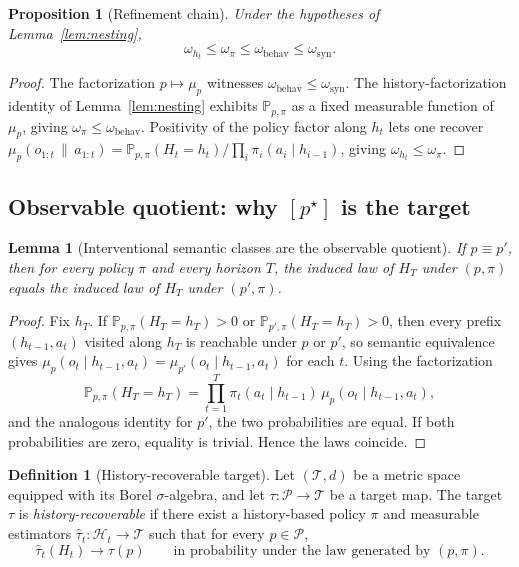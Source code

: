 \documentclass[11pt]{article}
\newtheorem{proposition}[theorem]{Proposition}
\newtheorem{lemma}[theorem]{Lemma}
\theoremstyle{definition}
\newtheorem{definition}[theorem]{Definition}
\theoremstyle{remark}
\newcommand{\Pcal}{\mathcal{P}}
\newcommand{\Hcal}{\mathcal{H}}
\newcommand{\Prob}{\mathbb{P}}
\newcommand{\givena}{\,\|\,}
\begin{document}
\begin{proposition}[Refinement chain]
\label{prop:refinement-chain}
Under the hypotheses of Lemma~\ref{lem:nesting},
\[
\omega_{h_t}\le\omega_\pi\le\omega_{\mathrm{behav}}\le\omega_{\mathrm{syn}}.
\]
\end{proposition}

\begin{proof}
The factorization $p\mapsto\mu_p$ witnesses $\omega_{\mathrm{behav}}\le\omega_{\mathrm{syn}}$. The history-factorization identity of Lemma~\ref{lem:nesting} exhibits $\Prob_{p,\pi}$ as a fixed measurable function of $\mu_p$, giving $\omega_\pi\le\omega_{\mathrm{behav}}$. Positivity of the policy factor along $h_t$ lets one recover $\mu_p(o_{1:t}\givena a_{1:t})=\Prob_{p,\pi}(H_t=h_t)/\prod_i\pi_i(a_i\mid h_{i-1})$, giving $\omega_{h_t}\le\omega_\pi$.
\end{proof}

\subsection{Observable quotient: why $[p^\star]$ is the target}

\begin{lemma}[Interventional semantic classes are the observable quotient]
\label{lem:observable-quotient}
If $p\equiv p'$, then for every policy $\pi$ and every horizon $T$, the induced law of $H_T$ under $(p,\pi)$ equals the induced law of $H_T$ under $(p',\pi)$.
\end{lemma}

\begin{proof}
Fix $h_T$. If $\Prob_{p,\pi}(H_T=h_T)>0$ or $\Prob_{p',\pi}(H_T=h_T)>0$, then every prefix $(h_{t-1},a_t)$ visited along $h_T$ is reachable under $p$ or $p'$, so semantic equivalence gives $\mu_p(o_t\mid h_{t-1},a_t)=\mu_{p'}(o_t\mid h_{t-1},a_t)$ for each $t$. Using the factorization
\[
\Prob_{p,\pi}(H_T=h_T)
=
\prod_{t=1}^{T}\pi_t(a_t\mid h_{t-1})\,\mu_p(o_t\mid h_{t-1},a_t),
\]
and the analogous identity for $p'$, the two probabilities are equal. If both probabilities are zero, equality is trivial. Hence the laws coincide.
\end{proof}

\begin{definition}[History-recoverable target]
\label{def:history-recoverable}
Let $(\mathcal{T},d)$ be a metric space equipped with its Borel $\sigma$-algebra, and let $\tau:\Pcal\to\mathcal{T}$ be a target map. The target $\tau$ is \emph{history-recoverable} if there exist a history-based policy $\pi$ and measurable estimators $\hat\tau_t:\Hcal_t\to\mathcal{T}$ such that for every $p\in\Pcal$,
\[
\hat\tau_t(H_t)\longrightarrow \tau(p)
\qquad
\text{in probability under the law generated by } (p,\pi).
\]
\end{definition}
\end{document}

